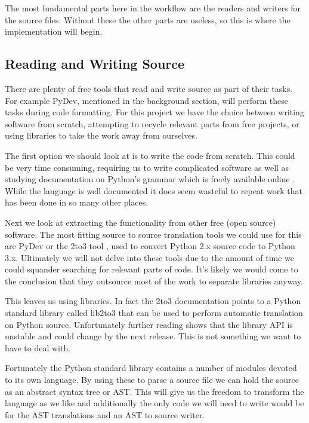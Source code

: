 \documentclass{report}
\begin{document}
The most fundamental parts here in the workflow are the readers and writers for the source files.
Without these the other parts are useless, so this is where the implementation will begin.

\subsection{Reading and Writing Source}

There are plenty of free tools that read and write source as part of their tasks. For example PyDev, mentioned in the background section, will
perform these tasks during code formatting. For this project we have the choice between writing software from scratch, attempting
to recycle relevant parts from free projects, or using libraries to take the work away from ourselves.

The first option we should look at is to write the code from scratch. This could be very time consuming, requiring
us to write complicated software as well as studying documentation on Python's grammar which is freely available online \cite{pygrammar}.
While the language is well documented it does seem wasteful to repeat work that has been done in so many other places.

Next we look at extracting the functionality from other free (open source) software. The most fitting source to source translation tools
we could use for this are PyDev or the 2to3 tool \cite{2to3}, used to convert Python 2.x source code to Python 3.x. Ultimately we will not
delve into these tools due to the amount of time we could squander searching for relevant parts of code. It's likely we
would come to the conclusion that they outsource most of the work to separate libraries anyway.

This leaves us using libraries. In fact the 2to3 documentation points to a Python standard library called lib2to3 that can be used to
perform automatic translation on Python source. Unfortunately further reading shows that the library API is unstable and could change by
the next release. This is not something we want to have to deal with.

Fortunately the Python standard library contains a number of modules devoted to its own language. By using these to parse a source file
we can hold the source as an abstract syntax tree or AST. This will give us the freedom to transform the language as we like and additionally the only code we
will need to write would be for the AST translations and an AST to source writer.
\end{document}
